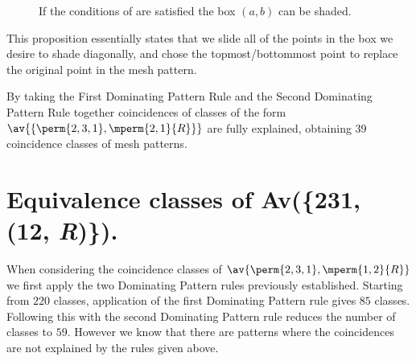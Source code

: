 \begin{figure}[ht]
\centering
{}
    \caption{If the conditions of  are satisfied the box
    \((a,b)\) can be shaded.}
\end{figure}

This proposition essentially states that we slide all of the points in the box we desire
to shade diagonally, and chose the topmost/bottommost point to replace the original
point in the mesh pattern.

By taking the First Dominating Pattern Rule and the Second Dominating Pattern
Rule together coincidences of classes of the form \(\av{\{\perm{2,3,1},\mperm{2,1}{R}\}}\)
are fully explained, obtaining 39 coincidence classes of mesh patterns.

\section{Equivalence classes of Av(\{231, (12, \textit{R})\}).}
When considering the coincidence classes of \(\av{\perm{2,3,1},\mperm{1,2}{R}}\)
we first apply the two Dominating Pattern rules previously established.
Starting from \(220\) classes, application of the first Dominating Pattern rule
gives \(85\) classes. Following this with the second Dominating Pattern rule
reduces the number of classes to \(59\). However we know that there are patterns
where the coincidences are not explained by the rules given above.

